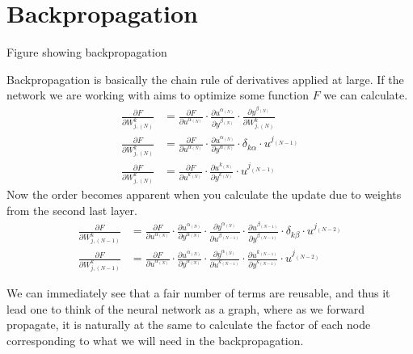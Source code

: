 \section{Backpropagation}
\begin{marginfigure}
\caption{Figure showing backpropagation}
\label{fig.backprop}
\end{marginfigure} 
Backpropagation is basically the chain rule of derivatives applied at large. If the network we are working with aims to optimize some function $F$ we can calculate.
\begin{align}
	\frac{\partial F}{\partial W_{j,(N)}^k}  &= \frac{\partial F}{\partial u^{\alpha_{(N)}}} \cdot \frac{\partial u^{\alpha_{(N)}}}{\partial y^{\beta_{(N)}}} \cdot \frac{\partial y^{\beta_{(N)}}}{\partial W_{j,(N)}^k} \\
	\frac{\partial F}{\partial W_{j,(N)}^k}  &= \frac{\partial F}{\partial u^{\alpha_{(N)}}} \cdot \frac{\partial u^{\alpha_{(N)}}}{\partial y^{\alpha_{(N)}}} \cdot \delta_{k \alpha} \cdot u^{j_{(N-1)}} \\
	\frac{\partial F}{\partial W_{j,(N)}^k}  &= \frac{\partial F}{\partial u^{k_{(N)}}} \cdot \frac{\partial u^{k_{(N)}}}{\partial y^{k_{(N)}}} \cdot u^{j_{(N-1)}}
\end{align}
Now the order becomes apparent when you calculate the update due to weights from the second last layer.
\begin{align}
	\frac{\partial F}{\partial W_{j,(N-1)}^k}  &= \frac{\partial F}{\partial u^{\alpha_{(N)}}} \cdot \frac{\partial u^{\alpha_{(N)}}}{\partial y^{\alpha_{(N)}}} \cdot \frac{\partial y^{\alpha_{(N)}}}{\partial u^{\beta_{(N-1)}}} \cdot \frac{\partial u^{\beta_{(N-1)}}}{\partial y^{\beta_{(N-1)}}} \cdot \delta_{k \beta} \cdot u^{j_{(N-2)}} \\
	\frac{\partial F}{\partial W_{j,(N-1)}^k}  &= \frac{\partial F}{\partial u^{\alpha_{(N)}}} \cdot \frac{\partial u^{\alpha_{(N)}}}{\partial y^{\alpha_{(N)}}} \cdot \frac{\partial y^{\alpha_{(N)}}}{\partial u^{k_{(N-1)}}} \cdot \frac{\partial u^{k_{(N-1)}}}{\partial y^{k_{(N-1)}}} \cdot u^{j_{(N-2)}} 
\end{align}

We can immediately see that a fair number of terms are reusable, and thus it lead one to think of the neural network as a graph, where as we forward propagate, it is naturally at the same to calculate the factor of each node corresponding to what we will need in the backpropagation.\\

